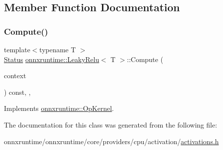 \subsection{Member Function Documentation}
\mbox{\label{classonnxruntime_1_1LeakyRelu_a8fb7b20882b790aaf44d1ce283992d47}} 
\subsubsection{\texorpdfstring{Compute()}{Compute()}}
{\footnotesize\ttfamily template$<$typename T $>$ \\
\mbox{\hyperlink{classonnxruntime_1_1common_1_1Status}{Status}} \mbox{\hyperlink{classonnxruntime_1_1LeakyRelu}{onnxruntime\+::\+Leaky\+Relu}}$<$ T $>$\+::Compute (\begin{DoxyParamCaption}\item[{\mbox{\hyperlink{classonnxruntime_1_1OpKernelContext}{Op\+Kernel\+Context}} $\ast$}]{context }\end{DoxyParamCaption}) const\hspace{0.3cm}{\ttfamily [inline]}, {\ttfamily [override]}, {\ttfamily [virtual]}}



Implements \mbox{\hyperlink{classonnxruntime_1_1OpKernel_a9eca8656a78b1b3ab9d3351a12798650}{onnxruntime\+::\+Op\+Kernel}}.



The documentation for this class was generated from the following file\+:\begin{DoxyCompactItemize}
\item 
onnxruntime/onnxruntime/core/providers/cpu/activation/\mbox{\hyperlink{cpu_2activation_2activations_8h}{activations.\+h}}\end{DoxyCompactItemize}
